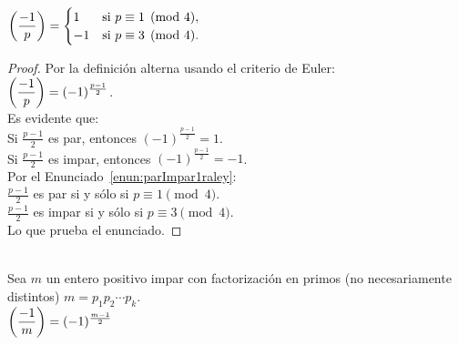 \begin{enunciado} \, \\
$\left(\dfrac{-1}{p}\right) = 
\begin{cases}
1 & \text{si } p \equiv 1 \pmod 4, \\
-1 & \text{si } p \equiv 3 \pmod 4.
\end{cases}$
\end{enunciado}

\begin{proof} Por la definición alterna usando el criterio de Euler: \\
$\left(\dfrac{-1}{p}\right) = (-1)^{\frac{p-1}{2}}$. \\
Es evidente que: \\
Si $\frac{p-1}{2}$ es par, entonces $(-1)^{\frac{p-1}{2}} = 1$. \\
Si $\frac{p-1}{2}$ es impar, entonces $(-1)^{\frac{p-1}{2}} = -1$. \\
Por el Enunciado~\ref{enun:parImpar1raley}: \\
$\frac{p-1}{2}$ es par si y sólo si $p \equiv 1 \pmod{4}$. \\
$\frac{p-1}{2}$ es impar si y sólo si $p \equiv 3 \pmod{4}$. \\
Lo que prueba el enunciado.
\end{proof}

\begin{enunciado} \, \\
Sea $m$ un entero positivo impar con factorización en primos (no necesariamente distintos) $m=p_1p_2\cdots p_k$. \\
$\left(\dfrac{-1}{m}\right) = (-1)^{\frac{m-1}{2}}$
\end{enunciado}

